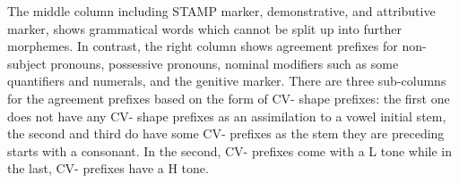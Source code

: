 \begin{table} 
\centering
{}
\caption{Agreement classes and their target POS in Gyeli}
\label{Tab:AGRcl}
\end{table}

\noindent The middle column including STAMP marker, demonstrative, and attributive marker, shows grammatical words which cannot be split up into further morphemes. In contrast, the right column shows agreement prefixes for  non-subject pronouns, possessive pronouns, nominal modifiers such as some quantifiers and numerals, and the  genitive marker. There are three sub-columns for the agreement prefixes based on the form of CV- shape prefixes: the first one does not have any CV- shape prefixes as an assimilation to a vowel initial stem, the second and third do have some CV- prefixes as the stem they are preceding starts with a consonant. In the second, CV- prefixes come with a L tone while in the last, CV- prefixes have a H tone.%


